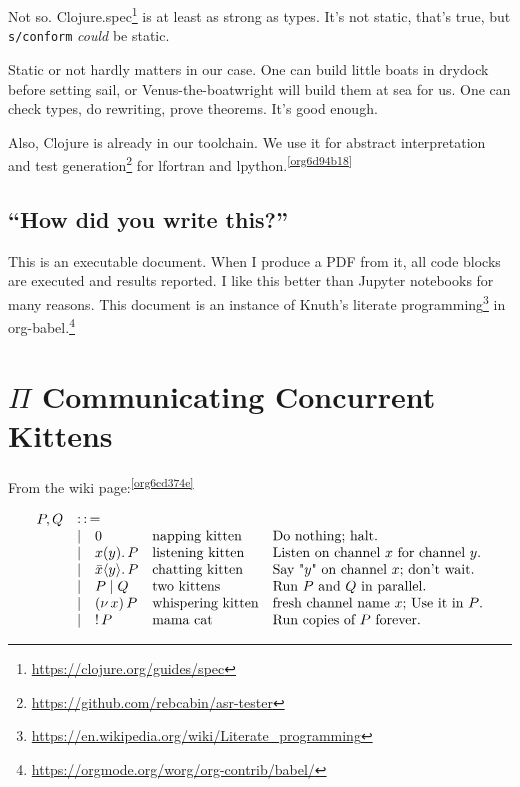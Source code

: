 \documentclass[10pt,oneside,x11names]{article}
\newcommand{\Coloneqq}{\mathrel{\vcenter{\hbox{$:\,:\,=$}}{}}}
\newcommand\napping    [0]{0}
\newcommand\chatting   [3]{\bar{#1}\langle{#2}\rangle{}.\,#3}
\newcommand\listening  [3]{#1(#2).\,#3}
\newcommand\two        [2]{#1\mathrel{\vert}{#2}}
\newcommand\whispering [2]{(\nu\,#1)\,{#2}}
\newcommand\mama       [1]{!\,{#1}}
\theoremstyle{definition}
\theoremstyle{warning}
\begin{document}
Not so. Clojure.spec\footnote{\url{https://clojure.org/guides/spec}} is at
least as strong as types. It's not static, that's true, but
\texttt{s/conform} \emph{could} be static.

Static or not hardly matters in our case. One can build little
boats in drydock before setting sail, or Venus-the-boatwright will
build them at sea for us. One can check types, do rewriting,
prove theorems. It's good enough.

Also, Clojure is already in our toolchain. We use it for abstract
interpretation and test generation\footnote{\url{https://github.com/rebcabin/asr-tester}}
for lfortran and lpython.\textsuperscript{\ref{org6d94b18}}

\subsection{``How did you write this?''}
\label{sec:org8c56bb5}

This is an executable document. When I produce a PDF from it, all
code blocks are executed and results reported. I like this better
than Jupyter notebooks for many reasons. This document
is an instance of Knuth's literate programming\footnote{\url{https://en.wikipedia.org/wiki/Literate\_programming}}
in org-babel.\footnote{\url{https://orgmode.org/worg/org-contrib/babel/}}

\newpage
\section{\(\Pi\) Communicating Concurrent Kittens}
\label{sec:org16194d1}

From the wiki page:\textsuperscript{\ref{org6cd374e}}

\begin{equation}
\begin{array}{clll}
  P, Q & \Coloneqq \\
       & | \quad \napping            & \textrm{napping kitten}    & \textrm{Do nothing; halt.}                                    \\
       & | \quad \listening{x}{y}{P} & \textrm{listening kitten}  & \textrm{Listen on channel }x\textrm{ for channel }y\textrm{.} \\
       & | \quad \chatting{x}{y}{P}  & \textrm{chatting kitten}   & \textrm{Say "}y\textrm{" on channel }x\textrm{; don't wait.}  \\
       & | \quad \two{P}{Q}          & \textrm{two kittens}       & \textrm{Run }P\textrm{ and }Q\textrm{ in parallel.}           \\
       & | \quad \whispering{x}{P}   & \textrm{whispering kitten} & \textrm{fresh channel name }x\textrm{; Use it in }P\textrm{.} \\
       & | \quad \mama{P}            & \textrm{mama cat}          & \textrm{Run copies of }P\textrm{ forever.} \\
\end{array}
\end{equation}
\end{document}
